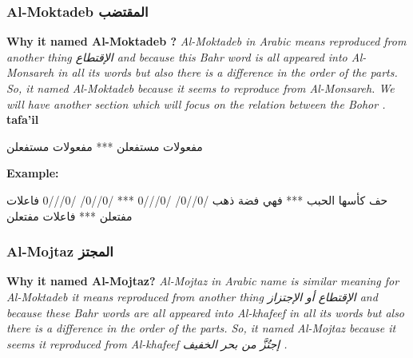 \subsubsection{Al-Moktadeb \textarabic{المقتضب}}
\textbf{Why it named Al-Moktadeb ?}
\textit{Al-Moktadeb in Arabic means reproduced from another thing \textarabic{الإقتطاع} and because this Bahr word is all appeared into Al-Monsareh in all its words but also there is a difference in the order of the parts. So, it named Al-Moktadeb because it seems to reproduce from Al-Monsareh. We will have another section which will focus on the relation between the Bohor \cite{Alkafi1994}.  %
}\\


\textbf{tafa'il}

\begin{Arabic}
  \begin{traditionalpoem*}

مفعولات مستفعلن *** مفعولات مستفعلن

  \end{traditionalpoem*}
      \end{Arabic}


\textbf{Example:}

\begin{Arabic}
  \begin{traditionalpoem*}

    حف كأسها الحبب *** فهي فضة ذهب
    /0//0/  /0///0 *** /0//0/  /0///0
    فاعلات  مفتعلن *** فاعلات مفتعلن




	\end{traditionalpoem*}
      \end{Arabic}



\subsubsection{Al-Mojtaz \textarabic{المجتز}}
\textbf{Why it named Al-Mojtaz?}
\textit{Al-Mojtaz in Arabic name is similar meaning for Al-Moktadeb it means reproduced from another thing \textarabic{الإقتطاع أو الإجتزاز} and because these Bahr words are all appeared into Al-khafeef in all its words but also there is a difference in the order of the parts. So, it named Al-Mojtaz because it seems it reproduced from Al-khafeef \textarabic{إجتُزَّ من بحر الخفيف} \cite{Alkafi1994}.}\\


